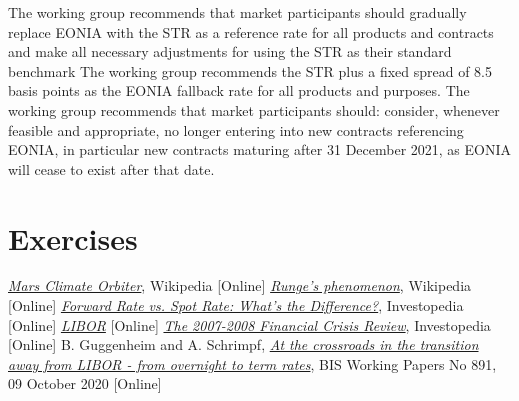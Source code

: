 The working group recommends that market participants should gradually replace EONIA with the STR as a reference rate for all products and contracts and make all necessary adjustments for using the STR as their standard benchmark The working group recommends the STR plus a fixed spread of 8.5
basis points as the EONIA fallback rate for all products and purposes. The working group recommends that market participants should: consider, whenever feasible and appropriate, no longer entering into new contracts referencing EONIA, in particular new contracts maturing after 31 December 2021, as EONIA will cease to exist after that date.


\section*{Exercises}


\begin{thebibliography}{9}
	\href{https://en.wikipedia.org/wiki/Mars_Climate_Orbiter}{\emph{Mars Climate Orbiter}}, Wikipedia [Online]
	 \href{https://en.wikipedia.org/wiki/Runge\%27s_phenomenon}{\emph{Runge's phenomenon}}, Wikipedia [Online]
	\href{https://www.investopedia.com/ask/answers/042315/what-difference-between-forward-rate-and-spot-rate.asp}{\emph{Forward Rate vs. Spot Rate: What's the Difference?}}, Investopedia [Online]
	 \href{https://www.ig.com/it/glossario-trading/definizione-di-libor}{\emph{LIBOR}} [Online]
	 \href{https://www.investopedia.com/articles/economics/09/financial-crisis-review.asp}{\emph{The 2007-2008 Financial Crisis Review}}, Investopedia [Online]
	B. Guggenheim and A. Schrimpf, 
	\href{https://www.bis.org/publ/work891.htm}{\emph{At the crossroads in the transition away from LIBOR - from overnight to term rates}}, BIS Working Papers No 891, 09 October 2020 [Online]
\end{thebibliography}
